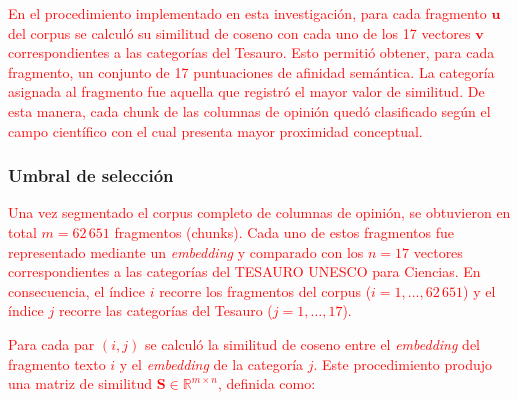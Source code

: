 \documentclass[11pt,a4paper]{article}
\begin{document}
		\textcolor{red}{En el procedimiento implementado en esta investigación, para cada fragmento $\mathbf{u}$ del corpus se calculó su similitud de coseno con cada uno de los 17 vectores $\mathbf{v}$ correspondientes a las categorías del Tesauro. Esto permitió obtener, para cada fragmento, un conjunto de 17 puntuaciones de afinidad semántica. La categoría asignada al fragmento fue aquella que registró el mayor valor de similitud. De esta manera, cada chunk de las columnas de opinión quedó clasificado según el campo científico con el cual presenta mayor proximidad conceptual.}
		
%	
%	
	
	

	\subsubsection{Umbral de selección}

\textcolor{red}{Una vez segmentado el corpus completo de columnas de opinión, se obtuvieron en total $m = 62\,651$ fragmentos (chunks). Cada uno de estos fragmentos fue representado mediante un \emph{embedding} y comparado con los $n = 17$ vectores correspondientes a las categorías del TESAURO UNESCO para Ciencias. En consecuencia, el índice $i$ recorre los fragmentos del corpus ($i = 1, \dots, 62\,651$) y el índice $j$ recorre las categorías del Tesauro ($j = 1, \dots, 17$).}

\textcolor{red}{
Para cada par $(i,j)$ se calculó la similitud de coseno entre el \emph{embedding} del fragmento texto $i$ y el \emph{embedding} de la categoría $j$. Este procedimiento produjo una matriz de similitud $\mathbf{S} \in \mathbb{R}^{m \times n}$, definida como:}
\end{document}
